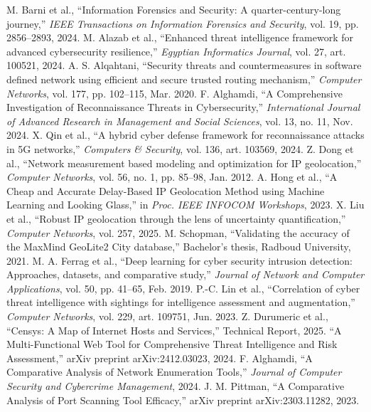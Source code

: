 \begin{thebibliography}{99}

 M. Barni et al., ``Information Forensics and Security: A quarter-century-long journey,'' \textit{IEEE Transactions on Information Forensics and Security}, vol. 19, pp. 2856--2893, 2024.
 M. Alazab et al., ``Enhanced threat intelligence framework for advanced cybersecurity resilience,'' \textit{Egyptian Informatics Journal}, vol. 27, art. 100521, 2024.
 A. S. Alqahtani, ``Security threats and countermeasures in software defined network using efficient and secure trusted routing mechanism,'' \textit{Computer Networks}, vol. 177, pp. 102--115, Mar. 2020.
 F. Alghamdi, ``A Comprehensive Investigation of Reconnaissance Threats in Cybersecurity,'' \textit{International Journal of Advanced Research in Management and Social Sciences}, vol. 13, no. 11, Nov. 2024.
 X. Qin et al., ``A hybrid cyber defense framework for reconnaissance attacks in 5G networks,'' \textit{Computers \& Security}, vol. 136, art. 103569, 2024.
 Z. Dong et al., ``Network measurement based modeling and optimization for IP geolocation,'' \textit{Computer Networks}, vol. 56, no. 1, pp. 85--98, Jan. 2012.
 A. Hong et al., ``A Cheap and Accurate Delay-Based IP Geolocation Method using Machine Learning and Looking Glass,'' in \textit{Proc. IEEE INFOCOM Workshops}, 2023.
 X. Liu et al., ``Robust IP geolocation through the lens of uncertainty quantification,'' \textit{Computer Networks}, vol. 257, 2025.
 M. Schopman, ``Validating the accuracy of the MaxMind GeoLite2 City database,'' Bachelor's thesis, Radboud University, 2021.
 M. A. Ferrag et al., ``Deep learning for cyber security intrusion detection: Approaches, datasets, and comparative study,'' \textit{Journal of Network and Computer Applications}, vol. 50, pp. 41--65, Feb. 2019.
 P.-C. Lin et al., ``Correlation of cyber threat intelligence with sightings for intelligence assessment and augmentation,'' \textit{Computer Networks}, vol. 229, art. 109751, Jun. 2023.
 Z. Durumeric et al., ``Censys: A Map of Internet Hosts and Services,'' Technical Report, 2025.
 ``A Multi-Functional Web Tool for Comprehensive Threat Intelligence and Risk Assessment,'' arXiv preprint arXiv:2412.03023, 2024.
 F. Alghamdi, ``A Comparative Analysis of Network Enumeration Tools,'' \textit{Journal of Computer Security and Cybercrime Management}, 2024.
 J. M. Pittman, ``A Comparative Analysis of Port Scanning Tool Efficacy,'' arXiv preprint arXiv:2303.11282, 2023.

\end{thebibliography}
